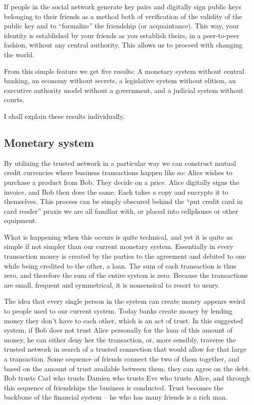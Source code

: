 If people in the social network generate key pairs and digitally sign public
keys belonging to their friends as a method both of verif\hbox{}ication of the
validity of the public key and to ``formalize'' the friendship (or
acquaintance). This way, your identity is established by your friends as you
establish theirs, in a peer-to-peer fashion, without any central authority.
This allows us to proceed with changing the world.

From this simple feature we get f\hbox{}ive results: A monetary system without
central banking, an economy without secrets, a legislative system without
elitism, an executive authority model without a government, and a judicial
system without courts.

I shall explain these results individually.


\subsection{Monetary system}
\label{s:artificial_scarcity:five_steps:monetary_system}

By utilizing the trusted network in a particular way we can construct mutual
credit currencies where business transactions happen like so: Alice wishes to
purchase a product from Bob. They decide on a price. Alice digitally signs the
invoice, and Bob then does the same. Each takes a copy and encrypts it to
themselves. This process can be simply obscured behind the ``put credit card in
card reader'' praxis we are all familiar with, or placed into cellphones or
other equipment.

What is happening when this occurs is quite technical, and yet it is quite as
simple if not simpler than our current monetary system. Essentially in every
transaction money is created by the parties to the agreement and debited to one
while being credited to the other, a loan. The sum of each transaction is thus
zero, and therefore the sum of the entire system is zero. Because the
transactions are small, frequent and symmetrical, it is nonsensical to resort 
to usury.

The idea that every single person in the system can create money appears weird
to people used to our current system. Today banks create money by lending money
they don't have to each other, which is an act of trust. In this suggested
system, if Bob does not trust Alice personally for the loan of this amount of
money, he can either deny her the transaction, or, more sensibly, traverse the
trusted network in search of a trusted connection that would allow for that
large a transaction. Some sequence of friends connect the two of them together,
and based on the amount of trust available between them, they can agree on the
debt. Bob trusts Carl who trusts Damien who trusts Eve who trusts Alice, and
through this sequence of friendships the business is conducted. Trust becomes
the backbone of the f\hbox{}inancial system – he who has many friends is a rich
man.

